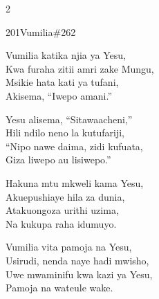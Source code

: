 \documentclass{article}
\begin{document}
\begin{multicols}{2}
\begin{hymn}{201}{Vumilia}{\#262}
\begin{stanza}
Vumilia katika njia ya Yesu,\\
Kwa furaha zitii amri zake Mungu,\\
Msikie hata kati ya tufani,\\
Akisema, ``Iwepo amani.''
\end{stanza}
\begin{stanza}
Yesu alisema, ``Sitawaacheni,''\\
Hili ndilo neno la kutufariji,\\
``Nipo nawe daima, zidi kufuata,\\
Giza liwepo au lisiwepo.''
\end{stanza}
\begin{stanza}
Hakuna mtu mkweli kama Yesu,\\
Akuepushiaye hila za dunia,\\
Atakuongoza urithi uzima,\\
Na kukupa raha idumuyo.
\end{stanza}
\begin{stanza}
Vumilia vita pamoja na Yesu,\\
Usirudi, nenda naye hadi mwisho,\\
Uwe mwaminifu kwa kazi ya Yesu,\\
Pamoja na wateule wake.
\end{stanza}
\end{hymn}


\end{multicols}
\end{document}
